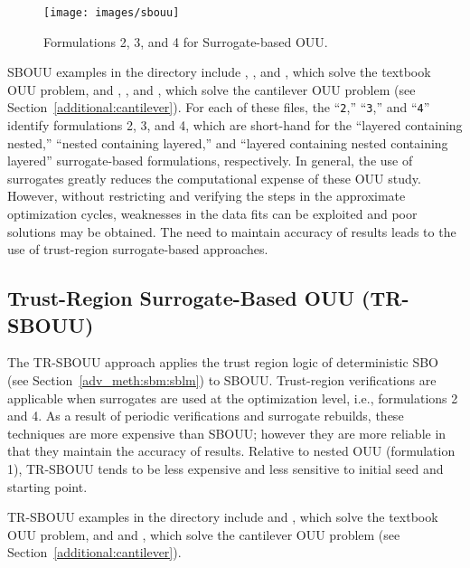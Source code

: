 \begin{figure}
  \centering
  \texttt{[image: images/sbouu]}
  \caption{Formulations 2, 3, and 4 for Surrogate-based OUU.}
  \label{adv_models:figure10}
\end{figure}

SBOUU examples in the  directory include
, ,
and , which solve the textbook OUU
problem, and ,
, and
, which solve the cantilever OUU
problem (see Section~\ref{additional:cantilever}). For each of these
files, the ``\texttt{2},'' ``\texttt{3},'' and ``\texttt{4}'' identify
formulations 2, 3, and 4, which are short-hand for the ``layered
containing nested,'' ``nested containing layered,'' and ``layered
containing nested containing layered'' surrogate-based formulations,
respectively. In general, the use of surrogates greatly reduces the
computational expense of these OUU study. However, without restricting
and verifying the steps in the approximate optimization cycles,
weaknesses in the data fits can be exploited and poor solutions may be
obtained. The need to maintain accuracy of results leads to the use of
trust-region surrogate-based approaches.

\subsection{Trust-Region Surrogate-Based OUU (TR-SBOUU)}\label{adv_models:ouu:trsb}

The TR-SBOUU approach applies the trust region logic of deterministic
SBO (see Section~\ref{adv_meth:sbm:sblm}) to SBOUU. Trust-region verifications
are applicable when surrogates are used at the optimization level,
i.e., formulations 2 and 4. As a result of periodic verifications and
surrogate rebuilds, these techniques are more expensive than SBOUU;
however they are more reliable in that they maintain the accuracy of
results. Relative to nested OUU (formulation 1), TR-SBOUU tends to be
less expensive and less sensitive to initial seed and starting point.

TR-SBOUU examples in the  directory include
 and
, which solve the textbook OUU
problem, and  and
, which solve the cantilever
OUU problem (see Section~\ref{additional:cantilever}).

